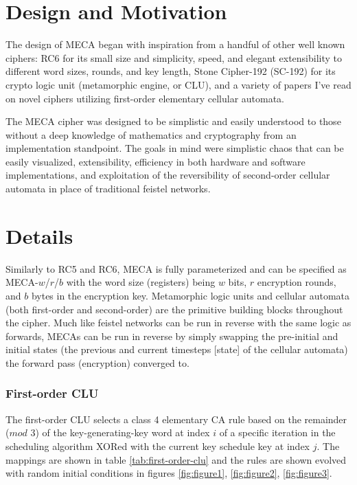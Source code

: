 \documentclass{article}
\begin{document}
\section{Design and Motivation}

The design of MECA began with inspiration from a handful of other well known ciphers: RC6\cite{RC6} for its small size and simplicity, speed, and elegant extensibility to different word sizes, rounds, and key length, Stone Cipher-192 (SC-192)\cite{SC-192} for its crypto logic unit (metamorphic engine, or CLU), and a variety of papers I've read on novel ciphers utilizing first-order elementary cellular automata.

The MECA cipher was designed to be simplistic and easily understood to those without a deep knowledge of mathematics and cryptography from an implementation standpoint. The goals in mind were simplistic chaos that can be easily visualized, extensibility, efficiency in both hardware and software implementations, and exploitation of the reversibility of second-order cellular automata in place of traditional feistel networks.

\section{Details}

Similarly to RC5 and RC6, MECA is fully parameterized and can be specified as MECA-$w$/$r$/$b$ with the word size (registers) being $w$ bits, $r$ encryption rounds, and $b$ bytes in the encryption key. Metamorphic logic units and cellular automata (both first-order and second-order) are the primitive building blocks throughout the cipher. Much like feistel networks can be run in reverse with the same logic as forwards, MECAs can be run in reverse by simply swapping the pre-initial and initial states (the previous and current timesteps [state] of the cellular automata) the forward pass (encryption) converged to.

\subsubsection{First-order CLU}

The first-order CLU selects a class 4 elementary CA rule based on the remainder ($mod$ 3) of the key-generating-key word at index $i$ of a specific iteration in the scheduling algorithm XORed with the current key schedule key at index $j$. The mappings are shown in table \ref{tab:first-order-clu} and the rules are shown evolved with random initial conditions in figures \ref{fig:figure1}, \ref{fig:figure2}, \ref{fig:figure3}.
\end{document}

